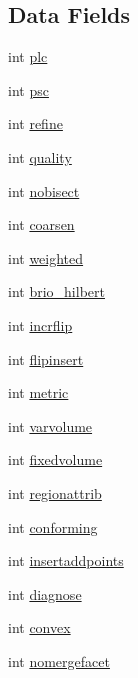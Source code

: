 \subsection*{Data Fields}
\begin{DoxyCompactItemize}
\item 
int \hyperlink{classtetgenbehavior_a40797ab5b2da5eeb579c6bdfe18b15af}{plc}
\item 
int \hyperlink{classtetgenbehavior_aa0dcda160582fc2d2e39689961c47cfc}{psc}
\item 
int \hyperlink{classtetgenbehavior_a1db02f7b2524f86a79e5835bece8c6cd}{refine}
\item 
int \hyperlink{classtetgenbehavior_ac071721fb930cc08160743886b412889}{quality}
\item 
int \hyperlink{classtetgenbehavior_a14b1ffe9dae2e1849d22739d2ef3ba20}{nobisect}
\item 
int \hyperlink{classtetgenbehavior_a58032e83757a8447015fd99d7053db8c}{coarsen}
\item 
int \hyperlink{classtetgenbehavior_a6ad479e03a42fab8c5f6e4d6adb1be47}{weighted}
\item 
int \hyperlink{classtetgenbehavior_a26ae57c732cb3e74a94355c9a74c1612}{brio\+\_\+hilbert}
\item 
int \hyperlink{classtetgenbehavior_a340fcbca73520d6cbd33cc5ef113554d}{incrflip}
\item 
int \hyperlink{classtetgenbehavior_a42f3d0b7e5592ff2e920128bae4e442b}{flipinsert}
\item 
int \hyperlink{classtetgenbehavior_ad3c713eee4e296ce83387b778975a0ee}{metric}
\item 
int \hyperlink{classtetgenbehavior_a59fc93472c81cfe360ddb76c7e008d8e}{varvolume}
\item 
int \hyperlink{classtetgenbehavior_a42624c92f7ddb79c01775898ffedec33}{fixedvolume}
\item 
int \hyperlink{classtetgenbehavior_a9784f5c855b4aa50a0327ab1805f14f1}{regionattrib}
\item 
int \hyperlink{classtetgenbehavior_ac02fe16d48959b6ba9d85a1a3f5a0187}{conforming}
\item 
int \hyperlink{classtetgenbehavior_a663e7008fca88d61ff34f01716c98da8}{insertaddpoints}
\item 
int \hyperlink{classtetgenbehavior_a40cd0446f3d881658ed5754a3002c46e}{diagnose}
\item 
int \hyperlink{classtetgenbehavior_a691a8d3d667ed0709c7995248731c57d}{convex}
\item 
int \hyperlink{classtetgenbehavior_ae9694a67868753691892d5224fa51a19}{nomergefacet}

\end{DoxyCompactItemize}
